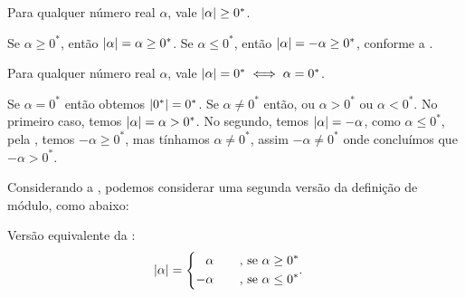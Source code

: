 \documentclass[../main.tex]{subfiles}
\begin{document}
\begin{teo}\label{reais-teo-moduloPositivo}
    Para qualquer número real $\alpha$, vale $\abs{\alpha} \geq 0^*$.
\end{teo}
\begin{dem}
    Se $\alpha \geq 0^*$, então $\abs{\alpha} = \alpha \geq 0^*$. 
    Se $\alpha \leq 0^*$, então $\abs{\alpha} = -\alpha \geq 0^*$, conforme a . 
\end{dem}
\begin{prop}\label{reais-prop-mod00}
    Para qualquer número real $\alpha$, vale $\abs{\alpha} = 0^* \iff \alpha = 0^*$.
\end{prop}
\begin{dem}
    Se $\alpha = 0^*$ então obtemos $\abs{0^*} = 0^*$. 
    Se $\alpha \neq 0^*$ então, ou $\alpha > 0^*$ ou $\alpha < 0^*$. No primeiro caso, temos $\abs{\alpha} = \alpha > 0^*$. No segundo, temos $\abs{\alpha} = -\alpha$, como $\alpha \leq 0^*$, pela , temos $-\alpha \geq 0^*$, mas tínhamos $\alpha \neq 0^*$, assim $-\alpha \neq 0^*$ onde concluímos que $-\alpha > 0^*$.
\end{dem}

\begin{obs}
    Considerando a , podemos considerar uma segunda versão da definição de módulo, como abaixo:
\end{obs}

\begin{defi}\label{reais-def-modulo2}
    Versão equivalente da : 
    \begin{equation*}
        \abs{\alpha} = 
        \begin{cases}
        \begin{aligned}
             &\alpha \hspace{0.6cm} \text{ , se } \alpha \geq 0^* \\
            -&\alpha \hspace{0.6cm} \text{ , se } \alpha \leq 0^*
        \end{aligned}.
        \end{cases}            
    \end{equation*}
\end{defi}
\end{document}
